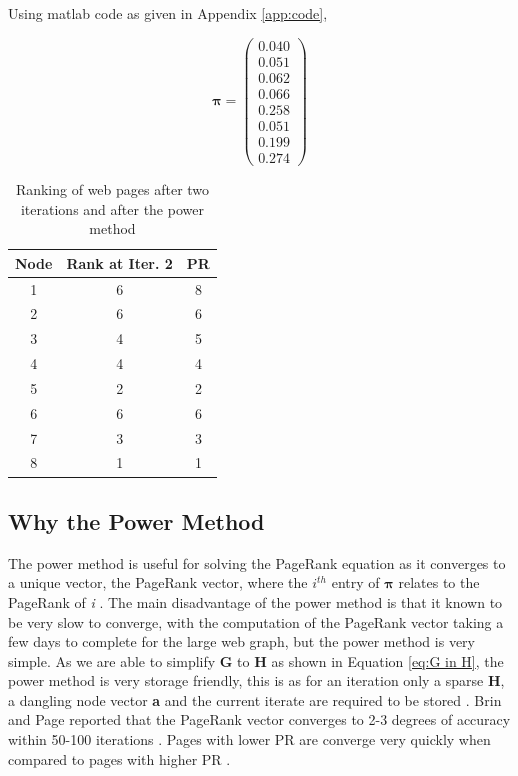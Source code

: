 \documentclass[11pt]{report}
\begin{document}
Using matlab code as given in Appendix \ref{app:code}, 

\[\boldsymbol\pi = \left(
\begin{array}{c}
0.040 \\
0.051 \\
0.062 \\
0.066 \\
0.258 \\
0.051 \\
0.199 \\
0.274
\end{array}
\right)\]

\begin{table}[H] \caption{Ranking of web pages after two iterations and after the power method}
 \centering
 \begin{tabular} {c| c c} 
 Node & Rank at Iter. 2 & PR \\ [0.5ex] 
 \hline
 1&6&8\\
 2&6&6\\
 3&4&5\\
 4&4&4\\
 5&2&2\\
 6&6&6\\
 7&3&3\\
 8&1&1\\
 \end{tabular}
 \label{Table:PR and summ}
\end{table}

\subsection{Why the Power Method}\label{sec:why power}

The power method is useful for solving the PageRank equation as it converges to a unique vector, the PageRank vector, where the $i^{th}$ entry of $\boldsymbol\pi$ relates to the PageRank of \textit{i} \cite{ipsen2005analysis}. The main disadvantage of the power method is that it known to be very slow to converge, with the computation of the PageRank vector taking a few days to complete for the large web graph, but the power method is very simple. As we are able to simplify \textbf{G} to \textbf{H} as shown in Equation \eqref{eq:G in H}, the power method is very storage friendly, this is as for an iteration only a sparse \textbf{H}, a dangling node vector \textbf{a} and the current iterate are required to be stored \cite{langville}. Brin and Page reported that the PageRank vector converges to 2-3 degrees of accuracy within 50-100 iterations \cite{austin}. Pages with lower PR are converge very quickly when compared to pages with higher PR \cite{thorson2004modeling}.
\end{document}
